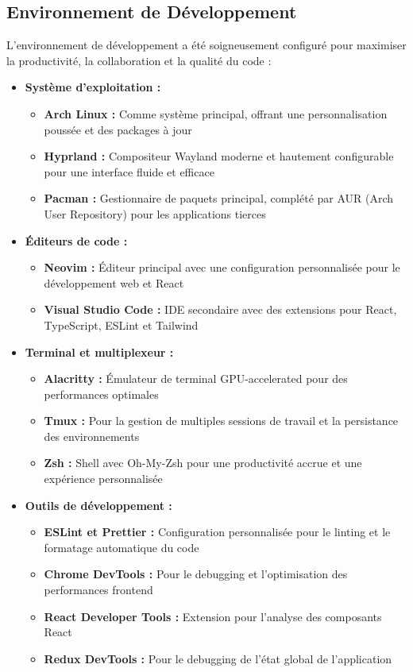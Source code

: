 \subsection{Environnement de Développement}
L'environnement de développement a été soigneusement configuré pour maximiser la productivité, la collaboration et la qualité du code :

\begin{itemize}
  \item \textbf{Système d'exploitation :} 
  \begin{itemize}
    \item \textbf{Arch Linux :} Comme système principal, offrant une personnalisation poussée et des packages à jour
    \item \textbf{Hyprland :} Compositeur Wayland moderne et hautement configurable pour une interface fluide et efficace
    \item \textbf{Pacman :} Gestionnaire de paquets principal, complété par AUR (Arch User Repository) pour les applications tierces
  \end{itemize}
  
  \item \textbf{Éditeurs de code :} 
  \begin{itemize}
    \item \textbf{Neovim :} Éditeur principal avec une configuration personnalisée pour le développement web et React
    \item \textbf{Visual Studio Code :} IDE secondaire avec des extensions pour React, TypeScript, ESLint et Tailwind
  \end{itemize}
  
  \item \textbf{Terminal et multiplexeur :} 
  \begin{itemize}
    \item \textbf{Alacritty :} Émulateur de terminal GPU-accelerated pour des performances optimales
    \item \textbf{Tmux :} Pour la gestion de multiples sessions de travail et la persistance des environnements
    \item \textbf{Zsh :} Shell avec Oh-My-Zsh pour une productivité accrue et une expérience personnalisée
  \end{itemize}
  
  \item \textbf{Outils de développement :}
  \begin{itemize}
    \item \textbf{ESLint et Prettier :} Configuration personnalisée pour le linting et le formatage automatique du code
    \item \textbf{Chrome DevTools :} Pour le debugging et l'optimisation des performances frontend
    \item \textbf{React Developer Tools :} Extension pour l'analyse des composants React
    \item \textbf{Redux DevTools :} Pour le debugging de l'état global de l'application
  \end{itemize}
  

\end{itemize}
